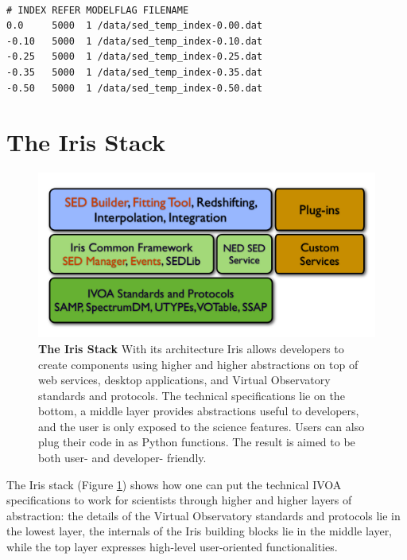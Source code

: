 \documentclass[final,5p,authoryear]{elsarticle}
\begin{document}
\begin{lstlisting}[style=code,
	caption=Example of template library definition file,
	label=lst:templateconfig]

# INDEX REFER MODELFLAG FILENAME
0.0     5000  1	/data/sed_temp_index-0.00.dat
-0.10   5000  1 /data/sed_temp_index-0.10.dat
-0.25   5000  1 /data/sed_temp_index-0.25.dat
-0.35   5000  1 /data/sed_temp_index-0.35.dat
-0.50   5000  1 /data/sed_temp_index-0.50.dat
\end{lstlisting}

\section{The Iris Stack} \label{sec:stack}

\begin{figure}
\begin{center}
\includegraphics[width=1.0\columnwidth]{figures/IrisStack.png} \caption{\textbf{The
Iris Stack} With its architecture Iris allows developers to create components
using higher and higher abstractions on top of web services, desktop
applications, and Virtual Observatory standards and protocols. The technical
specifications lie on the bottom, a middle layer provides abstractions useful to
developers, and the user is only exposed to the science features. Users can also
plug their code in as Python functions. The result is aimed to be both user- and
developer- friendly.}
\label{fig:stack}
\end{center}
\end{figure}

The Iris stack (Figure \ref{fig:stack}) shows how one can put the 
technical IVOA specifications to work for scientists through higher and higher
layers of abstraction: the details of the Virtual Observatory
standards and protocols lie in the lowest layer, the internals of the Iris
building blocks lie in the middle layer, while the top layer expresses
high-level user-oriented functionalities.
\end{document}
